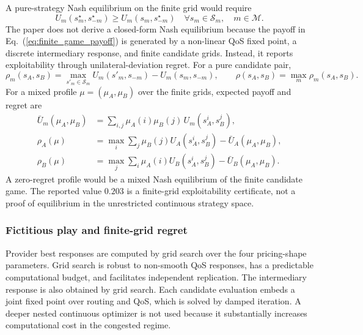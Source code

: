 \documentclass[11pt,a4paper]{article}
\newcommand{\M}{\mathcal{M}}
\begin{document}
A pure-strategy Nash equilibrium on the finite grid would require
\begin{equation}
  U_m(s_m^\star,s_{-m}^\star)
  \ge
  U_m(s_m,s_{-m}^\star)
  \quad
  \forall s_m\in\mathcal S_m,\quad m\in\M .
  \label{eq:pure_nash}
\end{equation}
The paper does not derive a closed-form Nash equilibrium because the payoff in Eq.~(\ref{eq:finite_game_payoff}) is generated by a non-linear QoS fixed point, a discrete intermediary response, and finite candidate grids. Instead, it reports exploitability through unilateral-deviation regret. For a pure candidate pair,
\begin{equation}
  \rho_m(s_A,s_B)
  =
  \max_{s'_m\in\mathcal S_m}U_m(s'_m,s_{-m})
  -U_m(s_m,s_{-m}),
  \qquad
  \rho(s_A,s_B)=\max_m\rho_m(s_A,s_B).
  \label{eq:pure_regret}
\end{equation}
For a mixed profile $\mu=(\mu_A,\mu_B)$ over the finite grids, expected payoff and regret are
\begin{align}
  \bar U_m(\mu_A,\mu_B)
  &=
  \sum_{i,j}\mu_A(i)\mu_B(j)\,U_m(s_A^i,s_B^j), \label{eq:mixed_payoff}\\
  \rho_A(\mu)
  &=
  \max_i\sum_j\mu_B(j)U_A(s_A^i,s_B^j)
  -\bar U_A(\mu_A,\mu_B), \nonumber\\
  \rho_B(\mu)
  &=
  \max_j\sum_i\mu_A(i)U_B(s_A^i,s_B^j)
  -\bar U_B(\mu_A,\mu_B). \label{eq:mixed_regret}
\end{align}
A zero-regret profile would be a mixed Nash equilibrium of the finite candidate game. The reported value $0.203$ is a finite-grid exploitability certificate, not a proof of equilibrium in the unrestricted continuous strategy space.

\subsubsection{Fictitious play and finite-grid regret}

Provider best responses are computed by grid search over the four pricing-shape parameters. Grid search is robust to non-smooth QoS responses, has a predictable computational budget, and facilitates independent replication. The intermediary response is also obtained by grid search. Each candidate evaluation embeds a joint fixed point over routing and QoS, which is solved by damped iteration. A deeper nested continuous optimizer is not used because it substantially increases computational cost in the congested regime.
\end{document}
